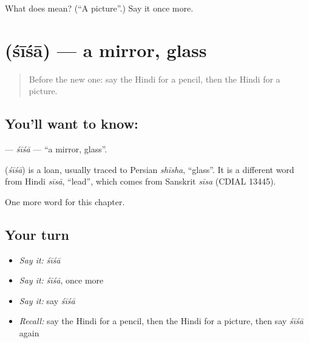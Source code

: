 \begin{tcolorbox}[breakable,colback=teal!4,colframe=teal!35!black,title={Before you move on}]
What does  mean? (\textquotedblleft{}A picture\textquotedblright{}.) Say it once more.
\end{tcolorbox}
\section[\texorpdfstring{\hi{शीशा} (śīśā)}{शीशा (śīśā)}]{ (śīśā) — a mirror, glass}

\label{lesson:HI-C134-sisa}



\begin{quote}
Before the new one: say the Hindi for a pencil, then the Hindi for a picture.
\end{quote}

\subsection*{You'll want to know: }
\textbf{} — \emph{śīśā} — \textquotedblleft{}a mirror, glass\textquotedblright{}.

\begin{cousinweb}
\textbf{} (\emph{śīśā}) is a loan, usually traced to Persian \emph{shīsha}, \textquotedblleft{}glass\textquotedblright{}. It is a different word from Hindi \emph{sīsā}, \textquotedblleft{}lead\textquotedblright{}, which comes from Sanskrit \emph{sīsa} (CDIAL 13445).
\end{cousinweb}

\begin{grammarlens}[title={What you've built}]
One more word for this chapter.
\end{grammarlens}

\subsection*{Your turn}
\begin{itemize}
\raggedright
  \item \emph{Say it:} \emph{śīśā}
  \item \emph{Say it:} \emph{śīśā}, once more
  \item \emph{Say it:} say \emph{śīśā}
  \item \emph{Recall:} say the Hindi for a pencil, then the Hindi for a picture, then say \emph{śīśā} again
\end{itemize}

